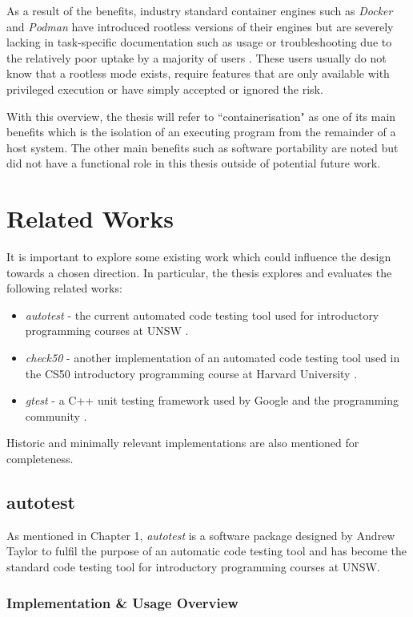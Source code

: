 \documentclass[hidelinks]{report}
\newcommand{\unchapter}[2]{
    \setcounter{chapter}{#1}
    \setcounter{section}{0}
    \chapter*{#2}
    \addcontentsline{toc}{chapter}{#2}
}
\begin{document}
As a result of the benefits, industry standard container engines such as \textit{Docker} and \textit{Podman} have introduced rootless versions of their engines but are severely lacking in task-specific documentation such as usage or troubleshooting due to the relatively poor uptake by a majority of users \cite{rootlessDocker}. These users usually do not know that a rootless mode exists, require features that are only available with privileged execution or have simply accepted or ignored the risk.

With this overview, the thesis will refer to ``containerisation" as one of its main benefits which is the isolation of an executing program from the remainder of a host system. The other main benefits such as software portability are noted but did not have a functional role in this thesis outside of potential future work.

\unchapter{3}{Related Works}

It is important to explore some existing work which could influence the design towards a chosen direction. In particular, the thesis explores and evaluates the following related works:
\begin{itemize}
	\item \textit{autotest} - the current automated code testing tool used for introductory programming courses at UNSW \cite{Autotest}.
	\item \textit{check50} - another implementation of an automated code testing tool used in the CS50 introductory programming course at Harvard University \cite{check50}.
	\item \textit{gtest} - a C++ unit testing framework used by Google and the programming community \cite{gtest}.
\end{itemize}
Historic and minimally relevant implementations are also mentioned for completeness.

\section{autotest}

As mentioned in Chapter 1, \textit{autotest} is a software package designed by Andrew Taylor to fulfil the purpose of an automatic code testing tool and has become the standard code testing tool for introductory programming courses at UNSW.

\subsection{Implementation \& Usage Overview}
\end{document}

